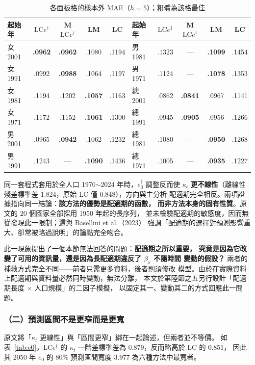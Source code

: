 \documentclass[UTF8, fontset=macnew, a4paper, 12pt]{ctexart}
\newcommand{\edag}{e_0^{\dagger}}
\newcommand{\LCe}{\mathrm{LC}e^{\dagger}}
\begin{document}
\begin{table}[H]
\centering
\caption{各面板格的樣本外 MAE（$h=5$）；粗體為該格最佳}
\small
\begin{tabular}{lcccc@{\hspace{14pt}}lcccc}
\toprule
起始年 & $\LCe$ & M$\LCe$ & LM & LC & 起始年 & $\LCe$ & M$\LCe$ & LM & LC\\
\midrule
女 2001 & \textbf{.0962} & \textbf{.0962} & .1080 & .1194 & 男 1981 & .1323 & --- & \textbf{.1099} & .1454\\
女 1991 & .0992 & \textbf{.0988} & .1064 & .1197 & 男 1971 & .1124 & --- & \textbf{.1078} & .1353\\
女 1981 & .1194 & .1202 & \textbf{.1057} & .1163 & 總 2001 & .0862 & \textbf{.0841} & .0967 & .1141\\
女 1971 & .1172 & .1152 & \textbf{.1061} & .1300 & 總 1991 & .0945 & \textbf{.0905} & .0956 & .1266\\
男 2001 & .0965 & \textbf{.0942} & .1062 & .1232 & 總 1981 & .1080 & --- & \textbf{.0950} & .1268\\
男 1991 & .1243 & --- & \textbf{.1090} & .1436 & 總 1971 & .1005 & --- & \textbf{.0935} & .1227\\
\bottomrule
\end{tabular}
\label{tab:panel}
\end{table}

同一套程式套用於全人口 1970$\sim$2024 年時，$\edag$ 調整反而使 $\kappa_t$
\textbf{更不線性}（離線性殘差標準差 1.824，原始 LC 僅 0.848），方向與主分析
配適期完全相反。兩項證據指向同一結論：\textbf{該方法的優勢是配適期的函數，
而非方法本身的固有性質}。原文的 20 個國家全部採用 1950 年起的長序列，
並未檢驗配適期的敏感度，因而無從發現此一限制；這與 Basellini et al.（2023）
強調「配適期的選擇對預測影響重大、卻常被略過說明」的論點完全吻合。

此一現象提出了一個本節無法回答的問題：\textbf{配適期之所以重要，
究竟是因為它改變了可用的資訊量，還是因為長配適期違反了 $\beta_x$ 不隨時間
變動的假設？} 兩者的補救方式完全不同——前者只需更多資料，後者則須修改
模型。由於在實際資料上配適期與資料量必然同時變動，無法分離，
本文於第陸節之五另行設計「配適期長度 $\times$ 人口規模」的二因子模擬，
以固定其一、變動其二的方式回應此一問題。

\subsubsection{（二）預測區間不是更窄而是更寬}

原文將「$\kappa_t$ 更線性」與「區間更窄」綁在一起論述，但兩者並不等價。
如表~\ref{tab:e0}，$\LCe$ 的 $\kappa_t$ 一階差標準差為 0.879，反而略高於 LC 的 0.851，
因此其 2050 年 $e_0$ 的 80\% 預測區間寬度 3.977 為六種方法中最寬者。
\end{document}
